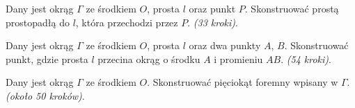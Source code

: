 \begin{problem}
    Dany jest okrąg $\Gamma$ ze środkiem $O$, prosta $l$ oraz punkt $P$.
    Skonstruować prostą prostopadłą do $l$, która przechodzi przez $P$. \hfill \emph{(33 kroki)}. %
\end{problem}

\begin{problem}
    Dany jest okrąg $\Gamma$ ze środkiem $O$, prosta $l$ oraz dwa punkty $A$, $B$.
    Skonstruować punkt, gdzie prosta $l$ przecina okrąg o środku $A$ i promieniu $AB$. \hfill \emph{(54 kroki)}. %
\end{problem}

\begin{problem}
    Dany jest okrąg $\Gamma$ ze środkiem $O$.
    Skonstruować pięciokąt foremny wpisany w $\Gamma$. \hfill \emph{(około 50 kroków)}. %
\end{problem}

